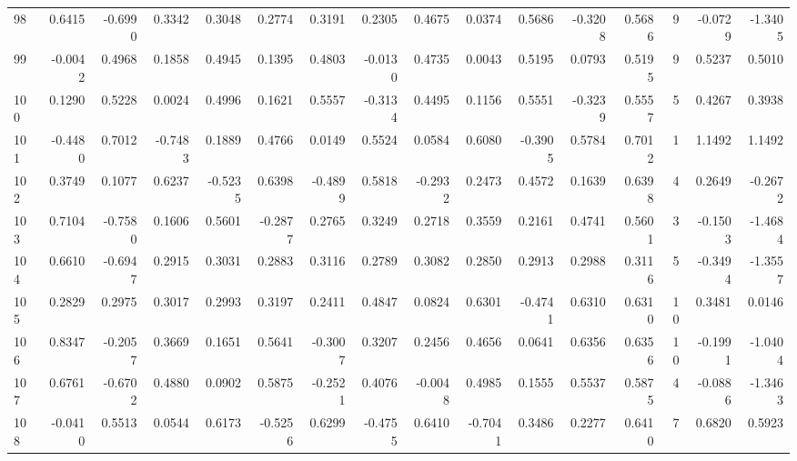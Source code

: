 \begin{tabular}{lrrrrrrrrrrrrrrr}
98  &      0.6415 & -0.6990 &  0.3342 &  0.3048 &  0.2774 &  0.3191 &  0.2305 &  0.4675 &  0.0374 &  0.5686 &  -0.3208 &     0.5686 &      9 &                   -0.0729 &                    -1.3405 \\
99  &     -0.0042 &  0.4968 &  0.1858 &  0.4945 &  0.1395 &  0.4803 & -0.0130 &  0.4735 &  0.0043 &  0.5195 &   0.0793 &     0.5195 &      9 &                    0.5237 &                     0.5010 \\
100 &      0.1290 &  0.5228 &  0.0024 &  0.4996 &  0.1621 &  0.5557 & -0.3134 &  0.4495 &  0.1156 &  0.5551 &  -0.3239 &     0.5557 &      5 &                    0.4267 &                     0.3938 \\
101 &     -0.4480 &  0.7012 & -0.7483 &  0.1889 &  0.4766 &  0.0149 &  0.5524 &  0.0584 &  0.6080 & -0.3905 &   0.5784 &     0.7012 &      1 &                    1.1492 &                     1.1492 \\
102 &      0.3749 &  0.1077 &  0.6237 & -0.5235 &  0.6398 & -0.4899 &  0.5818 & -0.2932 &  0.2473 &  0.4572 &   0.1639 &     0.6398 &      4 &                    0.2649 &                    -0.2672 \\
103 &      0.7104 & -0.7580 &  0.1606 &  0.5601 & -0.2877 &  0.2765 &  0.3249 &  0.2718 &  0.3559 &  0.2161 &   0.4741 &     0.5601 &      3 &                   -0.1503 &                    -1.4684 \\
104 &      0.6610 & -0.6947 &  0.2915 &  0.3031 &  0.2883 &  0.3116 &  0.2789 &  0.3082 &  0.2850 &  0.2913 &   0.2988 &     0.3116 &      5 &                   -0.3494 &                    -1.3557 \\
105 &      0.2829 &  0.2975 &  0.3017 &  0.2993 &  0.3197 &  0.2411 &  0.4847 &  0.0824 &  0.6301 & -0.4741 &   0.6310 &     0.6310 &     10 &                    0.3481 &                     0.0146 \\
106 &      0.8347 & -0.2057 &  0.3669 &  0.1651 &  0.5641 & -0.3007 &  0.3207 &  0.2456 &  0.4656 &  0.0641 &   0.6356 &     0.6356 &     10 &                   -0.1991 &                    -1.0404 \\
107 &      0.6761 & -0.6702 &  0.4880 &  0.0902 &  0.5875 & -0.2521 &  0.4076 & -0.0048 &  0.4985 &  0.1555 &   0.5537 &     0.5875 &      4 &                   -0.0886 &                    -1.3463 \\
108 &     -0.0410 &  0.5513 &  0.0544 &  0.6173 & -0.5256 &  0.6299 & -0.4755 &  0.6410 & -0.7041 &  0.3486 &   0.2277 &     0.6410 &      7 &                    0.6820 &                     0.5923 \\

\end{tabular}
